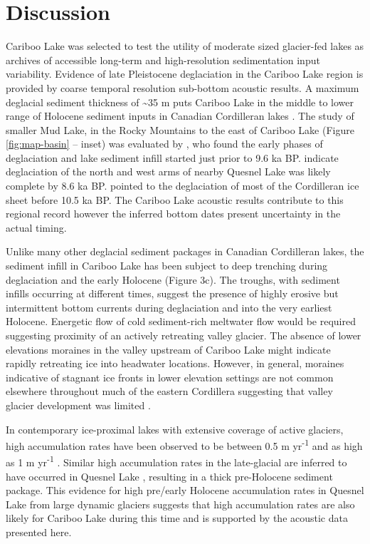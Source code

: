\documentclass[Royal,times,doublespace,sageh]{sagej}
\begin{document}
\hypertarget{discussion}{%
\section{Discussion}\label{discussion}}

Cariboo Lake was selected to test the utility of moderate sized
glacier-fed lakes as archives of accessible long-term and
high-resolution sedimentation input variability. Evidence of late
Pleistocene deglaciation in the Cariboo Lake region is provided by
coarse temporal resolution sub-bottom acoustic results. A maximum
deglacial sediment thickness of \textasciitilde35 m puts Cariboo Lake in
the middle to lower range of Holocene sediment inputs in Canadian
Cordilleran lakes \citep[see detailed discussion in][]{Gilbert2012}. The
study of smaller Mud Lake, in the Rocky Mountains to the east of Cariboo
Lake (Figure \ref{fig:map-basin} -- inset) was evaluated by
\citet{Hodder2006b}, who found the early phases of deglaciation and lake
sediment infill started just prior to 9.6 ka BP. \citet{Gilbert2012}
indicate deglaciation of the north and west arms of nearby Quesnel Lake
was likely complete by 8.6 ka BP. \citet{Menounos2009b} pointed to the
deglaciation of most of the Cordilleran ice sheet before 10.5 ka BP. The
Cariboo Lake acoustic results contribute to this regional record however
the inferred bottom dates present uncertainty in the actual timing.

Unlike many other deglacial sediment packages in Canadian Cordilleran
lakes, the sediment infill in Cariboo Lake has been subject to deep
trenching during deglaciation and the early Holocene (Figure 3c). The
troughs, with sediment infills occurring at different times, suggest the
presence of highly erosive but intermittent bottom currents during
deglaciation and into the very earliest Holocene. Energetic flow of cold
sediment-rich meltwater flow would be required suggesting proximity of
an actively retreating valley glacier. The absence of lower elevations
moraines in the valley upstream of Cariboo Lake might indicate rapidly
retreating ice into headwater locations. However, in general, moraines
indicative of stagnant ice fronts in lower elevation settings are not
common elsewhere throughout much of the eastern Cordillera suggesting
that valley glacier development was limited \citep{Menounos2009b}.

In contemporary ice-proximal lakes with extensive coverage of active
glaciers, high accumulation rates have been observed to be between 0.5 m
yr\textsuperscript{-1} \citep{Crookshanks2008} and as high as 1 m
yr\textsuperscript{-1} \citep{Gilbert1997}. Similar high accumulation
rates in the late-glacial are inferred to have occurred in Quesnel Lake
\citep{Gilbert2012}, resulting in a thick pre-Holocene sediment package.
This evidence for high pre/early Holocene accumulation rates in Quesnel
Lake from large dynamic glaciers suggests that high accumulation rates
are also likely for Cariboo Lake during this time and is supported by
the acoustic data presented here.
\end{document}
